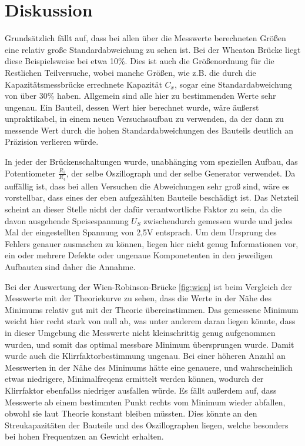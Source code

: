 \section{Diskussion}
\label{sec:Diskussion}

Grundsätzlich fällt auf, dass bei allen über die Messwerte berechneten Größen
eine relativ große Standardabweichung zu sehen ist. Bei der Wheaton Brücke liegt diese
Beispielsweise bei etwa 10\%. Dies ist auch die Größenordnung für die Restlichen Teilversuche,
wobei manche Größen, wie z.B. die durch die Kapazitätsmessbrücke errechnete Kapazität $C_x$,
sogar eine Standardabweichung von über 30\% haben. Allgemein sind alle hier zu bestimmenden
Werte sehr ungenau. Ein Bauteil, dessen Wert hier berechnet wurde, wäre äußerst unpraktikabel,
in einem neuen Versuchsaufbau zu verwenden, da der dann zu messende Wert durch die hohen Standardabweichungen
des Bauteils deutlich an Präzision verlieren würde. 

In jeder der Brückenschaltungen wurde, unabhänging vom speziellen Aufbau, das Potentiometer $\frac{R_3}{R_4}$,
der selbe Oszillograph und der selbe Generator verwendet. Da auffällig ist, dass bei allen Versuchen die Abweichungen
sehr groß sind, wäre es vorstellbar, dass eines der eben aufgezählten Bauteile beschädigt ist. Das Netzteil scheint an 
dieser Stelle nicht der dafür verantwortliche Faktor zu sein, da die davon ausgehende Speisespannung $U_S$ zwischendurch 
gemessen wurde und jedes Mal der eingestellten Spannung von 2,5\si{\volt} entsprach. Um dem Ursprung des Fehlers genauer 
ausmachen zu können, liegen hier nicht genug Informationen vor, ein oder mehrere Defekte oder ungenaue Komponetenten in 
den jeweiligen Aufbauten sind daher die Annahme.

Bei der Auswertung der Wien-Robinson-Brücke \ref{fig:wien} ist beim Vergleich der Messwerte mit der Theoriekurve zu sehen,
dass die Werte in der Nähe des Minimums relativ gut mit der Theorie übereinstimmen. Das gemessene Minimum weicht hier recht stark
von null ab, was unter anderem daran liegen könnte, dass in dieser Umgebung die Messwerte nicht kleinschrittig genug aufgenommen 
wurden, und somit das optimal messbare Minimum übersprungen wurde. Damit wurde auch die Klirrfaktorbestimmung ungenau.
Bei einer höheren Anzahl an Messwerten in der Nähe des Minimums hätte eine genauere, und wahrscheinlich etwas niedrigere, Minimalfreqenz
ermittelt werden können, wodurch der Klirrfaktor ebenfallss niedriger ausfallen würde.  Es fällt außerdem auf, dass Messwerte ab einem bestimmten 
Punkt rechts vom Minimum wieder abfallen, obwohl sie laut Theorie konstant bleiben müssten. Dies könnte an den Streukapazitäten der Bauteile und des Oszillographen liegen, 
welche besonders bei hohen Frequentzen an Gewicht erhalten.


